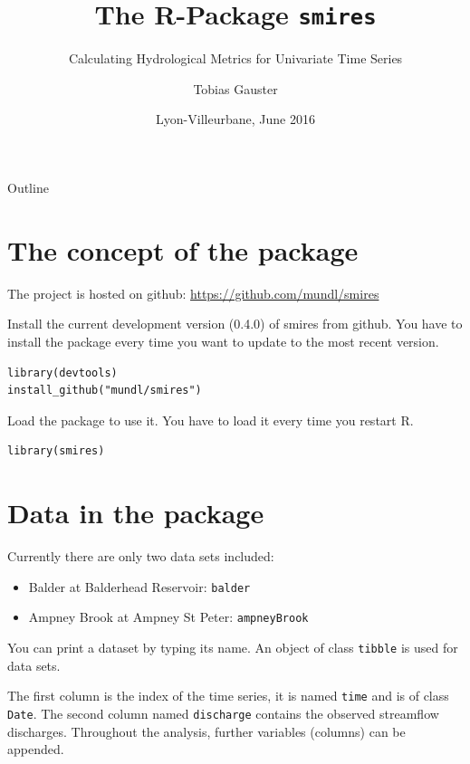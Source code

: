 \documentclass[xetex, german]{beamer}
\title{The R-Package \texttt{smires}}
\subtitle{Calculating Hydrological Metrics for Univariate Time Series}
\author{Tobias Gauster}
\institute
{
    Institute of Applied Statistics and Computing\\
    BOKU, Vienna 
}
\date{Lyon-Villeurbane, June 2016}
\begin{document}
    
\begin{frame}
  \titlepage
\end{frame}
    
\begin{frame}{Outline}
  \tableofcontents
\end{frame}

\section{The concept of the package}

\begin{frame}[fragile]
	The project is hosted on github: \url{https://github.com/mundl/smires}
	
	Install the current development version (0.4.0) of smires from github. You have to install the package every time you want to update to the most recent version.
	
\begin{verbatim}
library(devtools)
install_github("mundl/smires")
\end{verbatim}
	
	Load the package to use it. You have to load it every time you restart R.
\begin{verbatim}
library(smires)
\end{verbatim}
	

	
\end{frame}


\section{Data in the package}
\begin{frame}[fragile]
	Currently there are only two data sets included:
	\begin{itemize}
		\item Balder at Balderhead Reservoir: \verb|balder|
		\item  Ampney Brook at Ampney St Peter: \verb|ampneyBrook|
	\end{itemize}

You can print a dataset by typing its name. An object of class \verb|tibble| is used for data sets.

The first column is the index of the time series, it is named \verb|time| and is of class \verb|Date|. The second column named \verb|discharge| contains the observed streamflow discharges. Throughout the analysis, further variables (columns) can be appended.
	
\end{frame}
\end{document}
